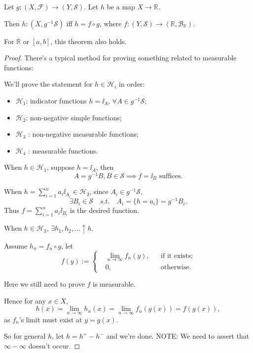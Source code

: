 \begin{theorem}
    Let $g: (X,\mathscr{F})\to (Y,\mathscr{S})$. Let $h$ be a map $X\to \mathbb{R}$.

	Then $h:(X, g^{-1}\mathscr{S})$ iff  $h = f\circ g$,
	where $f:(Y,\mathscr{S})\to(\mathbb{R}, \mathscr{B}_{\mathbb{R}})$.
\end{theorem}
\begin{remark}
	For $\overline{\mathbb{R}}$ or $[a,b]$, this theorem also holds.
\end{remark}
\begin{proof}[Proof]
    There's a typical method for proving something related to measurable functions:

	We'll prove the statement for $h\in \mathcal{H}_i$ in order:
	\begin{itemize}
		\item $ \mathcal{H}_1$: indicator functions $h=\ii_A$,
			$\forall A\in g^{-1}\mathscr{S}$;
		\item $\mathcal{H}_2$: non-negative simple functions;
		\item $\mathcal{H}_3$ : non-negative measurable functions;
		\item $ \mathcal{H}_4$ : measurable functions.
	\end{itemize}

	When $h\in \mathcal{H}_1$, suppose $h=\ii_A$, then
	 \[
	A = g^{-1} B, B\in \mathscr{S}\implies f = \ii_B \text{ suffices.}
	\]

	When $h = \sum_{i=1}^n a_i\ii_{A_i}\in \mathcal{H}_2$,
	since $A_i\in g^{-1}\mathscr{S}$,
	\[
	\exists B_i\in \mathscr{S}\quad s.t.\quad A_i = \{h = a_i\} = g^{-1}B_i.
	\]
	Thus $f = \sum_{i=1}^n a_i\ii_{B_i}$ is the desired function.

	When $h\in \mathcal{H}_3$, $\exists h_1,h_2,\dots\uparrow h$.

	Assume $h_n = f_n\circ g$, let
	 \[
	f(y) := \left\{
	\begin{aligned}
		&\lim_{n\to \infty}f_n(y), &&\text{if it exists;}\\
		&0, &&\text{otherwise.}
	\end{aligned}\right.
	\]
	\begin{remark}
	    Here we still need to prove $f$ is measurable.
	\end{remark}
	Hence for any $x\in X$,
	\[
		h(x) = \lim_{n\to \infty} h_n(x)
		= \lim_{n\to \infty}f_n(g(x)) = f(g(x)),
	\]
	as $f_n$'s limit must exist at  $y=g(x)$.

	So for general $h$, let $h = h^+ - h^-$ and we're done.
	NOTE: We need to assert that $\infty-\infty$ doesn't occur.
\end{proof}
